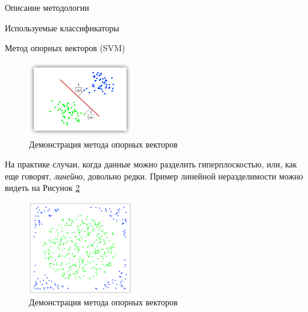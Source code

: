 \begin{section}{Описание методологии}
\begin{subsection}{Используемые классификаторы}
\begin{subsubsection}{Метод опорных векторов (SVM)}
\begin{figure}[ht!]
\centering
\includegraphics[width=0.4\textwidth]{pics/SVM3}
\caption{Демонстрация метода опорных векторов}
\label{pic:SVM3}
\end{figure}

На практике случаи, когда данные можно разделить гиперплоскостью, или, как еще говорят, \textit{линейно}, довольно редки. Пример линейной неразделимости можно видеть на Рисунок \ref{pic:SVM4}

\begin{figure}[ht!]
\centering
\includegraphics[width=0.4\textwidth]{pics/SVM4}
\caption{Демонстрация метода опорных векторов}
\label{pic:SVM4}
\end{figure}


\end{subsubsection}
\end{subsection}
\end{section}
